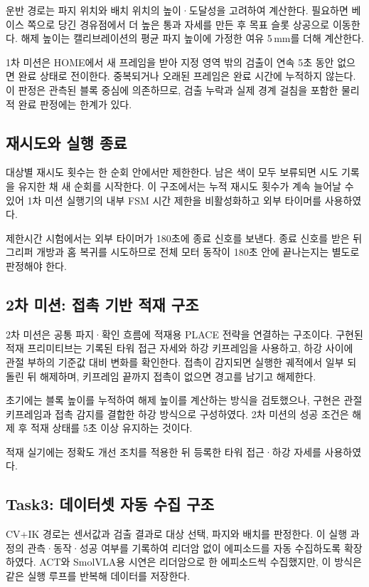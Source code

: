 운반 경로는 파지 위치와 배치 위치의 높이·도달성을 고려하여 계산한다. 필요하면 베이스 쪽으로 당긴 경유점에서 더 높은 통과 자세를 만든 후 목표 슬롯 상공으로 이동한다. 해제 높이는 캘리브레이션의 평균 파지 높이에 가정한 여유 5\,mm를 더해 계산한다.

1차 미션은 HOME에서 새 프레임을 받아 지정 영역 밖의 검출이 연속 5초 동안 없으면 완료 상태로 전이한다. 중복되거나 오래된 프레임은 완료 시간에 누적하지 않는다. 이 판정은 관측된 블록 중심에 의존하므로, 검출 누락과 실제 경계 걸침을 포함한 물리적 완료 판정에는 한계가 있다.

\subsection{재시도와 실행 종료}
대상별 재시도 횟수는 한 순회 안에서만 제한한다. 남은 색이 모두 보류되면 시도 기록을 유지한 채 새 순회를 시작한다. 이 구조에서는 누적 재시도 횟수가 계속 늘어날 수 있어 1차 미션 실행기의 내부 FSM 시간 제한을 비활성화하고 외부 타이머를 사용하였다.

제한시간 시험에서는 외부 타이머가 180초에 종료 신호를 보낸다. 종료 신호를 받은 뒤 그리퍼 개방과 홈 복귀를 시도하므로 전체 모터 동작이 180초 안에 끝나는지는 별도로 판정해야 한다.

\subsection{2차 미션: 접촉 기반 적재 구조}
2차 미션은 공통 파지·확인 흐름에 적재용 PLACE 전략을 연결하는 구조이다. 구현된 적재 프리미티브는 기록된 타워 접근 자세와 하강 키프레임을 사용하고, 하강 사이에 관절 부하의 기준값 대비 변화를 확인한다. 접촉이 감지되면 실행한 궤적에서 일부 되돌린 뒤 해제하며, 키프레임 끝까지 접촉이 없으면 경고를 남기고 해제한다.

초기에는 블록 높이를 누적하여 해제 높이를 계산하는 방식을 검토했으나, 구현은 관절 키프레임과 접촉 감지를 결합한 하강 방식으로 구성하였다. 2차 미션의 성공 조건은 해제 후 적재 상태를 5초 이상 유지하는 것이다.

적재 실기에는 정확도 개선 조치를 적용한 뒤 등록한 타워 접근·하강 자세를 사용하였다.

\subsection{Task3: 데이터셋 자동 수집 구조}
CV+IK 경로는 센서값과 검출 결과로 대상 선택, 파지와 배치를 판정한다. 이 실행 과정의 관측·동작·성공 여부를 기록하여 리더암 없이 에피소드를 자동 수집하도록 확장하였다. ACT와 SmolVLA용 시연은 리더암으로 한 에피소드씩 수집했지만, 이 방식은 같은 실행 루프를 반복해 데이터를 저장한다.

